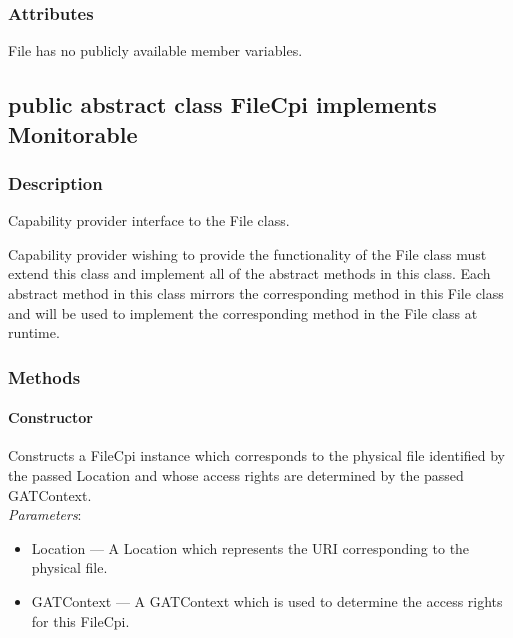 \documentclass[$Date: 2003/06/26 19:29:31 $]{glabarticle}
\begin{document}

\subsubsection{Attributes}

File has no publicly available member variables. 


\newpage

\subsection{public abstract class FileCpi implements Monitorable}


\subsubsection{Description}

Capability provider interface to the File class.

Capability provider wishing to provide the functionality of the File class must extend this class and
implement all of the abstract methods in this class. Each abstract method in this class mirrors the
corresponding method in this File class and will be used to implement the corresponding method in
the File class at runtime. 


\subsubsection{Methods}

\paragraph{Constructor}

Constructs a FileCpi instance which corresponds to the physical file
identified by the passed Location and whose access rights are
determined by the passed GATContext. \\

\textit{Parameters}:
\begin{itemize}
\item[] Location --- A Location which represents the URI corresponding to the physical file.
\item[] GATContext --- A GATContext which is used to determine the access rights for this FileCpi.
\end{itemize}
\end{document}
